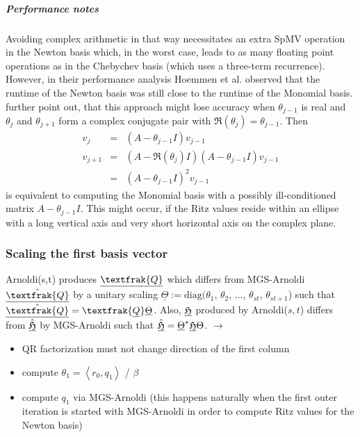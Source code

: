 \documentclass{scrartcl}
\numberwithin{equation}{section}
\begin{document}
\subparagraph{Performance notes}
Avoiding complex arithmetic in that way necessitates an extra SpMV operation in the Newton basis which, in the worst case, leads to as many floating point operations as in the Chebychev basis (which uses a three-term recurrence). However, in their performance analysis Hoemmen et al. \cite{Hoemmen:2010:CKS:1970638} observed that the runtime of the Newton basis was still close to the runtime of the Monomial basis. \\
\cite{Hoemmen:2010:CKS:1970638} further point out, that this approach might lose accuracy when $\theta_{j - 1}$ is real and $\theta_j$ and $\theta_{j + 1}$ form a complex conjugate pair with $\Re(\theta_j) = \theta_{j - 1} $. Then
\begin{eqnarray*}
v_j &=& (A - \theta_{j - 1} I )v_{j - 1} \\
v_{j + 1} &=& (A - \Re(\theta_j) I )(A - \theta_{j - 1} I )v_{j - 1} \\
		  &=& (A - \theta_{j - 1} I )^2v_{j - 1}
\end{eqnarray*}
is equivalent to computing the Monomial basis with a possibly ill-conditioned  matrix $A - \theta_{j - 1} I$. This might occur, if the Ritz values reside within an ellipse with a long vertical axis and very short horizontal axis on the complex plane.




\subsubsection{Scaling the first basis vector} \label{sec:scaling_first_basis_vec}
Arnoldi(s,t) produces $\underline{\textfrak{Q}}$ which differs from MGS-Arnoldi $\underline{\hat{\textfrak{Q}}}$ by a unitary scaling $\underline{\Theta} := \text{diag}(\theta_1$, $\theta_2$, $\ldots$, $\theta_{st}$, $\theta_{st+1}$) such that $\underline{\hat{\textfrak{Q}}} = \textfrak{\underline{Q}}\underline{\Theta}$. Also, $\underline{\frak{H}}$ produced by Arnoldi($s,t$) differs from $\underline{\hat{\frak{H}}}$ by MGS-Arnoldi such that $\hat{\underline{\frak{H}}} = \underline{\Theta}^\ast \underline{\frak{H}} \Theta$. $\rightarrow$
\begin{itemize}
\item QR factorization must not change direction of the first column
\item compute $\theta_1 = \left< r_0, q_1 \right>$ / $\beta$
\item compute $q_1$ via MGS-Arnoldi (this happens naturally when the first outer iteration is started with MGS-Arnoldi in order to compute Ritz values for the Newton basis)
\end{itemize}
\end{document}
